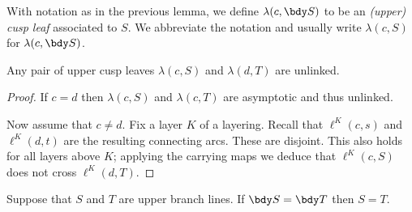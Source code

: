 \documentclass[12pt]{amsart}
\begin{document}
With notation as in the previous lemma, we define $\lambda(c, \bdy S)$ to be an \emph{(upper) cusp leaf} associated to $S$.  We abbreviate the notation and usually write $\lambda(c, S)$ for $\lambda(c, \bdy S)$.



\begin{lemma}
\label{Lem:Unlinked}
Any pair of upper cusp leaves $\lambda(c, S)$ and $\lambda(d, T)$ are unlinked.  
\end{lemma}

\begin{proof}
If $c = d$ then $\lambda(c, S)$ and $\lambda(c, T)$ are asymptotic and thus unlinked.

Now assume that $c \neq d$.  Fix a layer $K$ of a layering.  Recall that $\ell^K(c,s)$ and $\ell^K(d,t)$ are the resulting connecting arcs.  These are disjoint.  
This also holds for all layers above $K$; applying the carrying maps we deduce that $\ell^K(c,S)$ does not cross $\ell^K(d,T)$. 
\end{proof}

\begin{lemma}
\label{Lem:BranchLinesNotAsymptotic}
Suppose that $S$ and $T$ are upper branch lines.  If $\bdy S = \bdy T$ then $S = T$.
\end{lemma}
\end{document}
